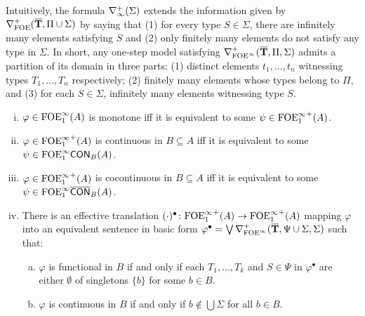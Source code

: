 Intuitively, the formula $\posdbnfinf{\Sigma}$ extends the information given by $\posdbnfofoe{\vlist{T}}{\Pi \cup \Sigma}$ by saying that (1) for every type $S\in\Sigma$, there are infinitely many elements satisfying $S$ and (2) only finitely many elements do not satisfy any type in $\Sigma$. In short, any one-step model satisfying $\posdbnfofoei{\vlist{T}}{\Pi}{\Sigma}$ admits a partition of its domain in three parts: (1) distinct elements $t_1,\dots,t_n$ witnessing types $T_1,\dots,T_n$ respectively; (2) finitely many elements whose types belong to $\Pi$, and (3) for each $S\in \Sigma$, infinitely many elements witnessing type $S$.


\begin{theorem} \label{th:ofoei-normalforms} 
\begin{enumerate}[(i)]
\item $\varphi  \in \ofoei(A)$ is monotone iff it is equivalent to some $\psi \in{\ofoei}^{+}(A)$. 
\item $\varphi  \in {\ofoei}^{+}(A)$ is continuous in $B \subseteq A$ iff it is equivalent to some $\psi \in\cont{\ofoei}{B}(A)$. 
\item $\varphi  \in {\ofoei}^{+}(A)$ is cocontinuous in $B \subseteq A$ iff it is equivalent to some $\psi \in\cocont{\ofoei}{B}(A)$. 
\item There is an effective translation $(\cdot)^{\bullet} \: {\ofoei}^{+}(A) \to {\ofoei}^{+}(A)$ mapping $\varphi$ into an equivalent sentence in basic form $\varphi^{\bullet} = \bigvee \mondbnfofoei{\vlist{T}}{\Psi \cup \Sigma}{\Sigma}{+}$ such that:
\begin{enumerate}[(a)]
\item $\varphi$ is functional in $B$ if and only if each $T_1, \dots, T_k$ and $S \in \Psi$ in $\varphi^{\bullet}$ are either $\emptyset$ of singletons $\{b\}$ for some $b \in B$.
\item $\varphi$ is continuous in $B$ if and only if $b\notin \bigcup\Sigma$ for all $b \in B$.
\end{enumerate}
\end{enumerate}
\end{theorem}

